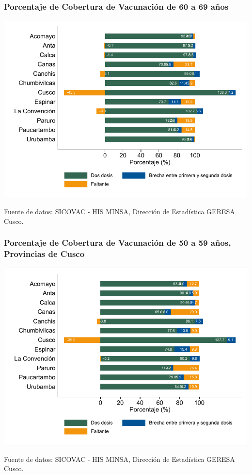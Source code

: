 \documentclass[xcolor=table]{beamer}
\begin{document}
\begin{frame}[label=vacunas_70]
	\frametitle{Porcentaje de Cobertura de Vacunación de 60 a 69 años}
	\vspace{-.5cm}
	\begin{center}
		\includegraphics[width=0.8\linewidth, trim={.2cm .5cm .2cm .2cm},clip]{../figuras/vacunacion_provincial_edad_7.pdf}
	\end{center}
	{\tiny Fuente de datos: SICOVAC - HIS MINSA, Dirección de Estadística GERESA Cusco. \\}
\hyperlink{cobertura_vacuna_provincias}{}
\end{frame}

\begin{frame}[label=vacunas_60]
	\frametitle{Porcentaje de Cobertura de Vacunación de 50 a 59 años, Provincias de Cusco}
	\vspace{-.5cm}
	\begin{center}
		\includegraphics[width=0.8\linewidth, trim={.2cm .5cm .2cm .2cm},clip]{../figuras/vacunacion_provincial_edad_6.pdf}
	\end{center}
	{\tiny Fuente de datos: SICOVAC - HIS MINSA, Dirección de Estadística GERESA Cusco. \\}
	\hyperlink{cobertura_vacuna_provincias}{}
\end{frame}
\end{document}
